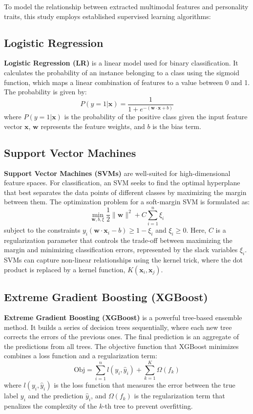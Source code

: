 To model the relationship between extracted multimodal features and personality traits, this study employs established supervised learning algorithms:

\subsection{Logistic Regression}
\textbf{Logistic Regression (LR)} is a linear model used for binary classification. It calculates the probability of an instance belonging to a class using the sigmoid function, which maps a linear combination of features to a value between 0 and 1. The probability is given by:
$$P(y=1 | \mathbf{x}) = \frac{1}{1 + e^{-(\mathbf{w} \cdot \mathbf{x} + b)}}$$
where $P(y=1|\mathbf{x})$ is the probability of the positive class given the input feature vector $\mathbf{x}$, $\mathbf{w}$ represents the feature weights, and $b$ is the bias term.

\subsection{Support Vector Machines}
\textbf{Support Vector Machines (SVMs)} are well-suited for high-dimensional feature spaces. For classification, an SVM seeks to find the optimal hyperplane that best separates the data points of different classes by maximizing the margin between them. The optimization problem for a soft-margin SVM is formulated as:
$$\min_{\mathbf{w}, b, \xi} \frac{1}{2} \|\mathbf{w}\|^2 + C \sum_{i=1}^{n} \xi_i$$
subject to the constraints $y_i(\mathbf{w} \cdot \mathbf{x}_i - b) \geq 1 - \xi_i$ and $\xi_i \geq 0$. Here, $C$ is a regularization parameter that controls the trade-off between maximizing the margin and minimizing classification errors, represented by the slack variables $\xi_i$. SVMs can capture non-linear relationships using the kernel trick, where the dot product is replaced by a kernel function, $K(\mathbf{x}_i, \mathbf{x}_j)$.

\subsection{Extreme Gradient Boosting (XGBoost)}
\textbf{Extreme Gradient Boosting (XGBoost)} is a powerful tree-based ensemble method. It builds a series of decision trees sequentially, where each new tree corrects the errors of the previous ones. The final prediction is an aggregate of the predictions from all trees. The objective function that XGBoost minimizes combines a loss function and a regularization term:
$$\text{Obj} = \sum_{i=1}^{n} l(y_i, \hat{y}_i) + \sum_{k=1}^{K} \Omega(f_k)$$
where $l(y_i, \hat{y}_i)$ is the loss function that measures the error between the true label $y_i$ and the prediction $\hat{y}_i$, and $\Omega(f_k)$ is the regularization term that penalizes the complexity of the $k$-th tree to prevent overfitting.

